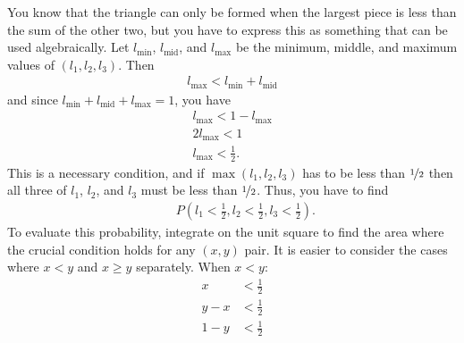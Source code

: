 \documentclass[a4paper]{article}
\begin{document}
\begin{center}
\end{center}
You know that the triangle can only be formed when the largest piece is less than the sum of the other two, but you have to express this as something that can be used algebraically.
Let
$l_\text{min}$,
$l_\text{mid}$, and
$l_\text{max}$
be the minimum, middle, and maximum values of
$(l_1, l_2, l_3)$.
Then
\begin{align*}
  l_\text{max} < l_\text{min} + l_\text{mid}
\end{align*}
and since
$  l_\text{min} + l_\text{mid} + l_\text{max}  = 1 $,
you have
\begin{align*}
  l_\text{max} < 1 - l_\text{max}  \\
2 l_\text{max} < 1 \\
 l_\text{max} < \frac{1}{2}
 \text{.}
\end{align*}
This is a necessary condition, and if
$\max(l_1, l_2, l_3)$
has to be less than
$\nicefrac{1}{2}$
then all three of
$l_1$, $l_2$, and $l_3$
must be less than $\nicefrac{1}{2}$.
Thus, you have to find
\begin{align*}
&\phantom{=}
P\left(
l_1 < \frac{1}{2} ,
l_2 < \frac{1}{2} ,
l_3 < \frac{1}{2}
\right)
\text{.}
\end{align*}
To evaluate this probability, integrate on the unit square to find the area where the crucial condition holds for any $(x,y)$ pair.
It is easier to consider the cases where $x<y$ and $x \geq y$ separately.
When $x<y$:
\begin{align*}
x     &< \frac{1}{2} \\
   y - x   &< \frac{1}{2} \\
1 -   y    &< \frac{1}{2}
\end{align*}
\end{document}

